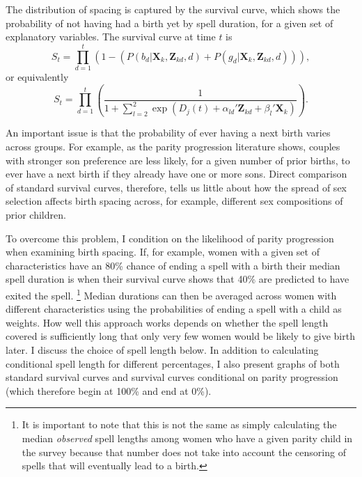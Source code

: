 \documentclass[12pt,letterpaper]{article}
\begin{document}
The distribution of spacing is captured by the survival curve, which shows 
the probability of not having had a birth yet by spell duration, for
a given set of explanatory variables.
The survival curve at time $t$ is 
\begin{equation}
S_{t} 
= 
\prod_{d=1}^t 
\left( 
	1- \left(P(b_{d} | \mathbf{X}_{k}, \mathbf{Z}_{kd}, d) 
	+ P(g_{d} | \mathbf{X}_{k}, \mathbf{Z}_{kd}, d) \right) 
\right),
 \label{eq:survival}
\end{equation}
or equivalently
\begin{equation}
S_{t} 
= 
\prod_{d=1}^t
\left(
\frac{ 1 }
{1 + \sum_{l=2}^2 \exp(D_j(t) + \alpha_{ld}'\mathbf{Z}_{kd} + \beta_l'\mathbf{X}_{k})}
\right).
\end{equation}

An important issue is that the probability of ever having a next birth varies 
across groups.
For example, as the parity progression literature shows, couples with stronger 
son preference are less likely, for a given number of prior births, to ever have 
a next birth if they already have one or more sons.
Direct comparison of standard survival curves, therefore, tells us little 
about how the spread of sex selection affects birth spacing across, for
example, different sex compositions of prior children.

To overcome this problem, I condition on the likelihood of parity progression 
when examining birth spacing.
If, for example, women with a given set of characteristics have an 80\%
chance of ending a spell with a birth their median spell duration is when
their survival curve shows that 40\% are predicted to have exited the spell.%
\footnote{
It is important to note that this is not the same as simply calculating 
the median \emph{observed} spell lengths among women who have a given 
parity child in the survey because that number does not take into account
the censoring of spells that will eventually lead to a birth.
}
Median durations can then be averaged across women with different 
characteristics using the probabilities of ending a spell with a child
as weights.
How well this approach works depends on whether the spell length covered is 
sufficiently long that only very few women would be likely to give
birth later.
I discuss the choice of spell length below.
In addition to calculating conditional spell length for different 
percentages, I also present graphs of both standard survival curves and
survival curves conditional on parity progression (which therefore
begin at 100\% and end at 0\%).
\end{document}
